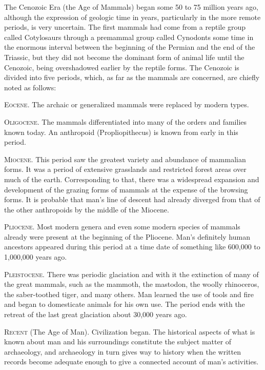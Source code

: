 The Cenozoic Era (the Age of Mammals) began some 50 to 75 million years ago, although the expression of geologic
time in years, particularly in the more remote periods, is very uncertain. The first mammals had come from a
reptile group called Cotylosaurs through a premammal group called Cynodonts some time in the enormous interval
between the beginning of the Permian and the end of the Triassic, but they did not become the dominant form of
animal life until the Cenozoic, being overshadowed earlier by the reptile forms. The Cenozoic is divided into
five periods, which, as far as the mammals are concerned, are chiefly noted as follows:

\textsc{Eocene}. The archaic or generalized mammals were replaced by 
modern types.

\textsc{Oligocene}. The mammals differentiated into many of the orders and families known today. An anthropoid
(Propliopithecus) is known from early in this period.

\textsc{Miocene}. This period saw the greatest variety and abundance of mammalian forms. It was a period of
extensive grasslands and restricted forest areas over much of the earth. Corresponding to that, there was a
widespread expansion and development of the grazing forms of mammals at the expense of the browsing forms. It
is probable that man's line of descent had already diverged from that of the other anthropoids by the middle
of the Miocene.

\textsc{Pliocene}. Most modern genera and even some modern species of mammals already were present at the
beginning of the Pliocene. Man's definitely human ancestors appeared during this period at a time date of
something like 600,000 to 1,000,000 years ago.

\textsc{Pleistocene}. There was periodic glaciation and with it the extinction of many of the great mammals,
such as the mammoth, the mastodon, the woolly rhinoceros, the saber-toothed tiger, and many others. Man
learned the use of tools and fire and began to domesticate animals for his own use. The period ends with the
retreat of the last great glaciation about 30,000 years ago.

\textsc{Recent} (The Age of Man). Civilization began. The historical aspects of what is known about man and his
surroundings constitute the subject matter of archaeology, and archaeology in turn gives way to history when
the written records become adequate enough to give a connected account of man's activities.

